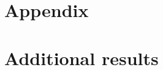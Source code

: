 \newpage
\clearpage
\section*{Appendix}

\setcounter{section}{0}
\setcounter{figure}{0}
\setcounter{table}{0}
\setcounter{page}{0}

\section{Additional results}